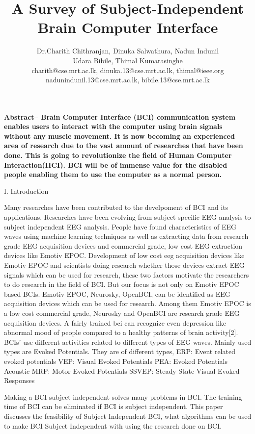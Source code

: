 \documentclass{article}
\title{ \Huge \textbf{A Survey of Subject-Independent Brain Computer Interface}}
\author{Dr.Charith Chithranjan, Dinuka Salwathura, Nadun Indunil 
\\ 
Udara Bibile, Thimal Kumarasinghe
\\
charith@cse.mrt.ac.lk, dinuka.13@cse.mrt.ac.lk, thimal@ieee.org\\ nadunindunil.13@cse.mrt.ac.lk, bibile.13@cse.mrt.ac.lk 
}
\date{}
\begin{document}
\maketitle
\begin{multicols}{2}
	
\textbf{	Abstract-- Brain Computer Interface (BCI) communication system enables users to interact with the computer using brain signals without any muscle movement. It is now becoming an experienced area of research due to the vast amount of researches that have been done. This is going to revolutionize the field of Human Computer Interaction(HCI). BCI will be of immense value for the disabled people enabling them to use the computer as a normal person. }

\begin{center}
I. Introduction
\end{center}
	Many researches have been contributed to the develpoment of BCI and its applications. Researches have been evolving from subject specific EEG analysis to subject independent EEG analysis. People have found characteristics of EEG waves using machine learning techniques as well as extracting data from research grade EEG acquisition devices and commercial grade, low cost EEG extraction devices like Emotiv EPOC.
	Development of low cost eeg acquisition devices like Emotiv EPOC and scientists doing research whether those devices extract EEG signals which can be used for research, these two factors motivate the researchers to do research in the field of BCI. But our focus is not only on Emotiv EPOC based BCIs. 
	Emotiv EPOC, Neurosky, OpenBCI, can be identified as EEG acquisition devices which can be used for research. Among them Emotiv EPOC is a low cost commercial grade, Neurosky and OpenBCI are research grade EEG acquisition devices.  A fairly trained bci can recognize even depression like abnormal mood of people compared to a healthy patterns of brain activity[2]. 
	BCIs’ use different activities related to different types of EEG waves. Mainly used types are Evoked Potentials. They are of different types, 
	ERP: Event related evoked potentials
	VEP: Visual Evoked Potentials
	PEA: Evoked Potentials Acoustic
	MRP: Motor Evoked Potentials
	SSVEP: Steady State Visual Evoked Responses  
	
	Making a BCI subject independent solves many problems in BCI. The training time of BCI can be eliminated  if BCI is subject independent.
	This paper discusses the feasibility of Subject Independent BCI, what algorithms can be used to make BCI Subject Independent with using the research done on BCI.


\end{multicols}
\end{document}

